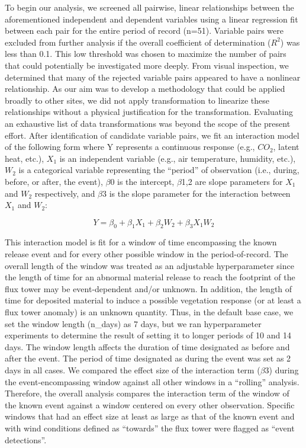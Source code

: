 \documentclass{article}
\begin{document}
To begin our analysis, we screened all pairwise, linear relationships between the aforementioned independent and dependent variables using a linear regression fit between each pair for the entire period of record (n=51). Variable pairs were excluded from further analysis if the overall coefficient of determination ($R^2$) was less than 0.1. This low threshold was chosen to maximize the number of pairs that could potentially be investigated more deeply. From visual inspection, we determined that many of the rejected variable pairs appeared to have a nonlinear relationship. As our aim was to develop a methodology that could be applied broadly to other sites, we did not apply transformation to linearize these relationships without a physical justification for the transformation. Evaluating an exhaustive list of data transformations was beyond the scope of the present effort. After identification of candidate variable pairs, we fit an interaction model of the following form where Y represents a continuous response (e.g., $CO_2$, latent heat, etc.), $X_1$ is an independent variable (e.g., air temperature, humidity, etc.), $W_2$ is a categorical variable representing the “period” of observation (i.e., during, before, or after, the event), $\beta$0 is the intercept, $\beta$1,2 are slope parameters for $X_1$ and $W_2$ respectively, and $\beta$3 is the slope parameter for the interaction between $X_1$ and $W_2$:

\[ Y = \beta_0 + \beta_1X_1 + \beta_2W_2 + \beta_3X_1W_2 \]

This interaction model is fit for a window of time encompassing the known release event and for every other possible window in the period-of-record. The overall length of the window was treated as an adjustable hyperparameter since the length of time for an abnormal material release to reach the footprint of the flux tower may be event-dependent and/or unknown. In addition, the length of time for deposited material to induce a possible vegetation response (or at least a flux tower anomaly) is an unknown quantity. Thus, in the default base case, we set the window length (n\_days) as 7 days, but we ran hyperparameter experiments to determine the result of setting it to longer periods of 10 and 14 days. The window length affects the duration of time designated as before and after the event. The period of time designated as during the event was set as 2 days in all cases. We compared the effect size of the interaction term ($\beta$3) during the event-encompassing window against all other windows in a “rolling” analysis. Therefore, the overall analysis compares the interaction term of the window of the known event against a window centered on every other observation. Specific windows that had an effect size at least as large as that of the known event and with wind conditions defined as “towards” the flux tower were flagged as “event detections”.
\end{document}
